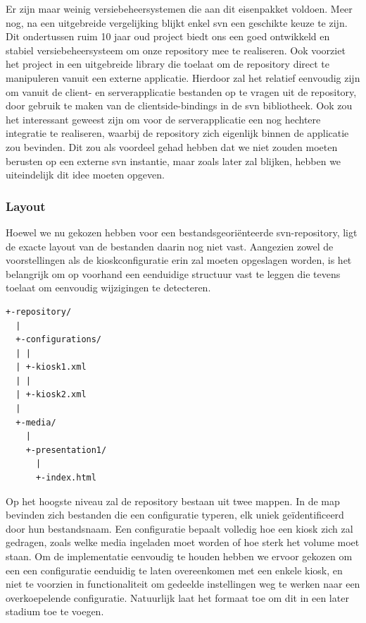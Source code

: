 Er zijn maar weinig versiebeheersystemen die aan dit eisenpakket voldoen. Meer nog, na een uitgebreide vergelijking blijkt enkel \ac{svn} een geschikte keuze te zijn. Dit ondertussen ruim 10 jaar oud project biedt ons een goed ontwikkeld en stabiel versiebeheersysteem om onze repository mee te realiseren. Ook voorziet het project in een uitgebreide library die toelaat om de repository direct te manipuleren vanuit een externe applicatie. Hierdoor zal het relatief eenvoudig zijn om vanuit de client- en serverapplicatie bestanden op te vragen uit de repository, door gebruik te maken van de clientside-bindings in de \ac{svn} bibliotheek. Ook zou het interessant geweest zijn om voor de serverapplicatie een nog hechtere integratie te realiseren, waarbij de repository zich eigenlijk binnen de applicatie zou bevinden. Dit zou als voordeel gehad hebben dat we niet zouden moeten berusten op een externe \ac{svn} instantie, maar zoals later zal blijken, hebben we uiteindelijk dit idee moeten opgeven.

\subsubsection{Layout}

Hoewel we nu gekozen hebben voor een bestandsgeoriënteerde \ac{svn}-repository, ligt de exacte layout van de bestanden daarin nog niet vast. Aangezien zowel de voorstellingen als de kioskconfiguratie erin zal moeten opgeslagen worden, is het belangrijk om op voorhand een eenduidige structuur vast te leggen die tevens toelaat om eenvoudig wijzigingen te detecteren.

\begin{lstlisting}[float, caption=Voorbeeld van een repository layout.]
+-repository/
  |
  +-configurations/
  | |
  | +-kiosk1.xml
  | |
  | +-kiosk2.xml
  |
  +-media/
    |
    +-presentation1/
      |
      +-index.html
\end{lstlisting}

Op het hoogste niveau zal de repository bestaan uit twee mappen. In de  map bevinden zich bestanden die een configuratie typeren, elk uniek geïdentificeerd door hun bestandsnaam. Een configuratie bepaalt volledig hoe een kiosk zich zal gedragen, zoals welke media ingeladen moet worden of hoe sterk het volume moet staan. Om de implementatie eenvoudig te houden hebben we ervoor gekozen om een een configuratie eenduidig te laten overeenkomen met een enkele kiosk, en niet te voorzien in functionaliteit om gedeelde instellingen weg te werken naar een overkoepelende configuratie. Natuurlijk laat het formaat toe om dit in een later stadium toe te voegen.

